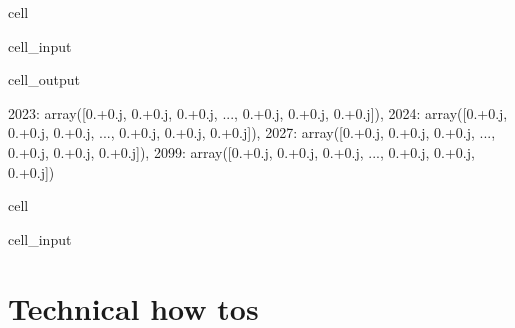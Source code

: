 \documentclass[letterpaper,10pt,english]{jupyterBook}
\begin{document}
\begin{sphinxuseclass}{cell}\begin{sphinxVerbatimInput}

\begin{sphinxuseclass}{cell_input}
\begin{sphinxVerbatim}[commandchars=\\\{\}]
\end{sphinxVerbatim}

\end{sphinxuseclass}\end{sphinxVerbatimInput}
\begin{sphinxVerbatimOutput}

\begin{sphinxuseclass}{cell_output}
\begin{sphinxVerbatim}[commandchars=\\\{\}]
\PYGZob{}2023: array([0.+0.j, 0.+0.j, 0.+0.j, ..., 0.+0.j, 0.+0.j, 0.+0.j]),
 2024: array([0.+0.j, 0.+0.j, 0.+0.j, ..., 0.+0.j, 0.+0.j, 0.+0.j]),
 2027: array([0.+0.j, 0.+0.j, 0.+0.j, ..., 0.+0.j, 0.+0.j, 0.+0.j]),
 2099: array([0.+0.j, 0.+0.j, 0.+0.j, ..., 0.+0.j, 0.+0.j, 0.+0.j])\PYGZcb{}
\end{sphinxVerbatim}

\end{sphinxuseclass}\end{sphinxVerbatimOutput}

\end{sphinxuseclass}
\begin{sphinxuseclass}{cell}\begin{sphinxVerbatimInput}

\begin{sphinxuseclass}{cell_input}
\begin{sphinxVerbatim}[commandchars=\\\{\}]
\end{sphinxVerbatim}

\end{sphinxuseclass}\end{sphinxVerbatimInput}

\end{sphinxuseclass}
\sphinxstepscope


\part{Technical how tos}
\end{document}
